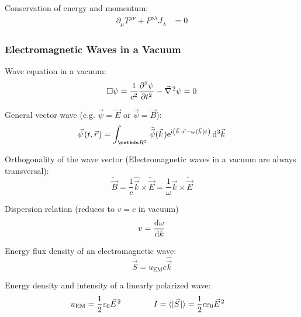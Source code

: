 			\noindent
			Conservation of energy and momentum:
			\begin{equation}
				\begin{aligned}
					\partial_\mu T^{\mu\nu} + F^{\nu\lambda} J_\lambda &= 0
				\end{aligned}
			\end{equation}


		\subsubsection{Electromagnetic Waves in a Vacuum}
			\noindent
			Wave equation in a vacuum:
			\begin{equation}
				\Box\psi = \frac{1}{c^2} \frac{\partial^2 \psi}{\partial t^2} - \Nabla^2 \psi = 0
			\end{equation}

			\noindent
			General vector wave (e.g. $\vec{\psi}=\vec{E}$ or $ \vec{\psi}=\vec{B}$):
			\begin{equation}
				\vec{\psi}(t,\vec{r}) = \int_{\reals ^3} \tilde{\vec{\psi}} (\vec{k}) \ex^{\i\left(\vec{k}\cdot\vec{r} - \omega(\vec{k})t \right)}\dd[3]{\vec{k}}
			\end{equation}

			\noindent
			Orthogonality of the wave vector (Electromagnetic waves in a vacuum are always transversal):
			\begin{equation}
				\tilde{\vec{B}} = \frac{1}{c}\hat{\vec{k}}\times\tilde{\vec{E}} = \frac{1}{\omega}\vec{k}\times\tilde{\vec{E}}
			\end{equation}

			\noindent
			Dispersion relation (reduces to $v=c$ in vacuum)
			\begin{equation}
				v = \dv{\omega}{k}
			\end{equation}

			\noindent
			Energy flux density of an electromagnetic wave:
			\begin{equation}
				\vec{S} = u_{\text{EM}}c\hat{\vec{k}}
			\end{equation}

			\noindent
			Energy density and intensity of a linearly polarized wave:
			\begin{equation}
				\begin{aligned}
					u_{\text{EM}} &= \frac{1}{2}\varepsilon_0\vec{E}^2 &\hsp
					I &= \langle|\vec{S}|\rangle = \frac{1}{2}c\varepsilon_0\vec{E}^2
				\end{aligned}
			\end{equation}

